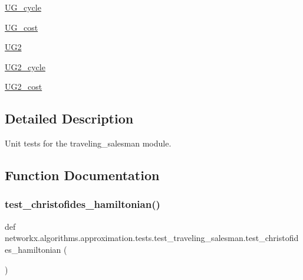 \begin{DoxyCompactItemize}
\hyperlink{namespacenetworkx_1_1algorithms_1_1approximation_1_1tests_1_1test__traveling__salesman_a229c1d1a19ef7f7c60bb1f87e8a76bf4}{U\+G\+\_\+cycle}
\item 
\hyperlink{namespacenetworkx_1_1algorithms_1_1approximation_1_1tests_1_1test__traveling__salesman_a1b5b6951981f0cd4117369e6af5416fd}{U\+G\+\_\+cost}
\item 
\hyperlink{namespacenetworkx_1_1algorithms_1_1approximation_1_1tests_1_1test__traveling__salesman_a74c75fbbda9076db0798a09afa070ced}{U\+G2}
\item 
\hyperlink{namespacenetworkx_1_1algorithms_1_1approximation_1_1tests_1_1test__traveling__salesman_a797dc1113e257e3bc6e79c0243a603fa}{U\+G2\+\_\+cycle}
\item 
\hyperlink{namespacenetworkx_1_1algorithms_1_1approximation_1_1tests_1_1test__traveling__salesman_a8c5223b8894584005687b1a8ea5961ef}{U\+G2\+\_\+cost}
\end{DoxyCompactItemize}


\subsection{Detailed Description}
\begin{DoxyVerb}Unit tests for the traveling_salesman module.\end{DoxyVerb}
 

\subsection{Function Documentation}
\mbox{\label{namespacenetworkx_1_1algorithms_1_1approximation_1_1tests_1_1test__traveling__salesman_a821b86d506f8c499fc8f085b6bcfa951}} 
\subsubsection{\texorpdfstring{test\+\_\+christofides\+\_\+hamiltonian()}{test\_christofides\_hamiltonian()}}
{\footnotesize\ttfamily def networkx.\+algorithms.\+approximation.\+tests.\+test\+\_\+traveling\+\_\+salesman.\+test\+\_\+christofides\+\_\+hamiltonian (\begin{DoxyParamCaption}{ }\end{DoxyParamCaption})}

